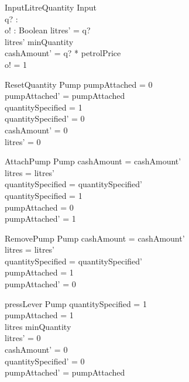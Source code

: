  \begin{schema}{InputLitreQuantity}
  Input \\
  q? : \nat \\
  o! : Boolean 
 \where
  litres' = q? \\
  litres' \geq minQuantity \\
  cashAmount' = q? * petrolPrice \\
  o! = 1
 \end{schema}
 
 \begin{schema}{ResetQuantity}
  \Delta Pump
 \where
  pumpAttached = 0 \\
  pumpAttached' = pumpAttached \\
  quantitySpecified = 1 \\
  quantitySpecified' = 0 \\
  cashAmount' = 0 \\
  litres' = 0 \\
 \end{schema}

 \begin{schema}{AttachPump}
  \Delta Pump
 \where
  cashAmount = cashAmount' \\
  litres = litres' \\
  quantitySpecified = quantitySpecified' \\
  quantitySpecified = 1 \\
  pumpAttached = 0 \\
  pumpAttached' = 1
 \end{schema}

 \begin{schema}{RemovePump}
  \Delta Pump
 \where
  cashAmount = cashAmount' \\
  litres = litres' \\
  quantitySpecified = quantitySpecified' \\
  pumpAttached = 1 \\
  pumpAttached' = 0
 \end{schema}

 \begin{schema}{pressLever}
  \Delta Pump
 \where
  quantitySpecified = 1 \\
  pumpAttached = 1 \\
  litres \geq minQuantity \\
  
  litres' = 0 \\
  cashAmount' = 0 \\
  quantitySpecified' = 0 \\
  pumpAttached' = pumpAttached
 \end{schema}

